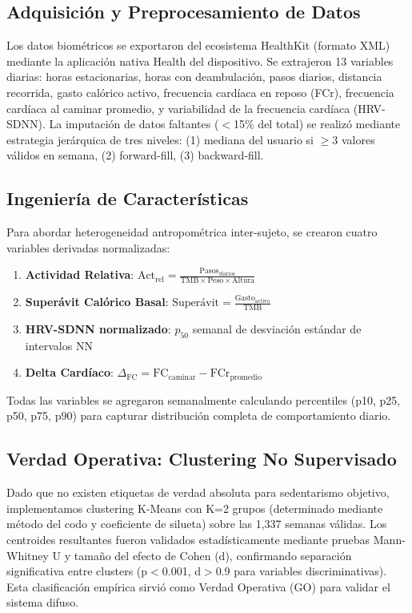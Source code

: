 \documentclass[journal,twoside,web]{ieeecolor}
\begin{document}
\subsection{Adquisición y Preprocesamiento de Datos}
Los datos biométricos se exportaron del ecosistema HealthKit (formato XML) mediante la aplicación nativa Health del dispositivo. Se extrajeron 13 variables diarias: horas estacionarias, horas con deambulación, pasos diarios, distancia recorrida, gasto calórico activo, frecuencia cardíaca en reposo (FCr), frecuencia cardíaca al caminar promedio, y variabilidad de la frecuencia cardíaca (HRV-SDNN). La imputación de datos faltantes ($<$15\% del total) se realizó mediante estrategia jerárquica de tres niveles: (1) mediana del usuario si $\geq$3 valores válidos en semana, (2) forward-fill, (3) backward-fill.

\subsection{Ingeniería de Características}
Para abordar heterogeneidad antropométrica inter-sujeto, se crearon cuatro variables derivadas normalizadas:

\begin{enumerate}
\item \textbf{Actividad Relativa}: $\text{Act}_{\text{rel}} = \frac{\text{Pasos}_{\text{diarios}}}{\text{TMB} \times \text{Peso} \times \text{Altura}}$

\item \textbf{Superávit Calórico Basal}: $\text{Superávit} = \frac{\text{Gasto}_{\text{activo}}}{\text{TMB}}$

\item \textbf{HRV-SDNN normalizado}: $p_{50}$ semanal de desviación estándar de intervalos NN

\item \textbf{Delta Cardíaco}: $\Delta_{\text{FC}} = \text{FC}_{\text{caminar}} - \text{FCr}_{\text{promedio}}$
\end{enumerate}

Todas las variables se agregaron semanalmente calculando percentiles (p10, p25, p50, p75, p90) para capturar distribución completa de comportamiento diario.

\subsection{Verdad Operativa: Clustering No Supervisado}
Dado que no existen etiquetas de verdad absoluta para sedentarismo objetivo, implementamos clustering K-Means con K=2 grupos (determinado mediante método del codo y coeficiente de silueta) sobre las 1,337 semanas válidas. Los centroides resultantes fueron validados estadísticamente mediante pruebas Mann-Whitney U y tamaño del efecto de Cohen (d), confirmando separación significativa entre clusters (p$<$0.001, d$>$0.9 para variables discriminativas). Esta clasificación empírica sirvió como Verdad Operativa (GO) para validar el sistema difuso.
\end{document}
